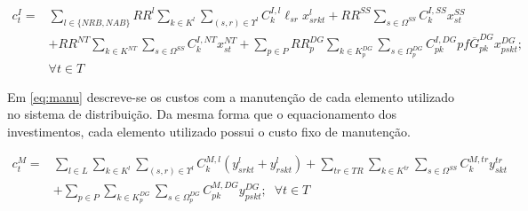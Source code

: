 
\begin{align}
     c^I_t  = & \sum_{l\in \{NRB, NAB\}} RR^l  \sum_{k\in K^l} \sum_{(s,r)\in \Upsilon^l}C^{I,l}_k \ell_{sr}x^l_{srkt}
     + RR^{SS}  \sum_{s \in \Omega^{SS}} C^{I,SS}_k x^{SS}_{st} \nonumber\\
     &+ RR^{NT}  \sum_{k\in K^{NT}} \sum_{s \in \Omega^{SS}}  C^{I,NT}_k x^{NT}_{st}
     +\sum_{p\in P}  RR^{DG}_p \sum_{k\in K^{DG}_p} \sum_{s \in \Omega^{DG}_p} C^{I,DG}_{pk} pf\overline{G}^{DG}_{pk} x^{DG}_{pskt};\nonumber\\ &\forall t \in T
     \label{eq:invest}
\end{align}

Em \eqref{eq:manu} descreve-se os custos com a manutenção de cada elemento utilizado no sistema de distribuição. Da mesma forma que o equacionamento dos investimentos, cada elemento utilizado possui o custo fixo de manutenção. 

\begin{align}
     c^M_t  = & \sum_{l\in L}  \sum_{k\in K^l} \sum_{(s,r)\in \Upsilon^l} C^{M,l}_k (y^l_{srkt} + y^l_{rskt})
     + \sum_{tr \in TR} \sum_{k\in K^{tr}} \sum_{s \in \Omega^{SS}} C^{M,tr}_k y^{tr}_{skt}\nonumber\\
     &+ \sum_{p\in P} \sum_{k\in K^{DG}_p}\sum_{s \in \Omega^{DG}_p} C^{M,DG}_{pk} y^{DG}_{pskt}; \; \; \forall t \in T
     \label{eq:manu}
\end{align}

